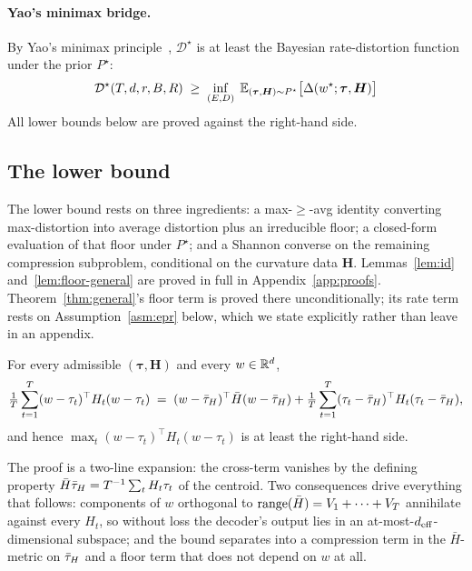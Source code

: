 \paragraph{Yao's minimax bridge.} By Yao's minimax
principle~\citep{yao1977}, $\mathcal{D}^\star$ is at least the
Bayesian rate-distortion function under the prior $P^\star$:
\begin{equation}\label{eq:yao}
  \mathcal{D}^\star(T,d,r,B,R)
  \;\geq\;
  \inf_{(E,D)}\;\mathbb{E}_{(\boldsymbol\tau,\boldsymbol H)\sim P^\star}
    \bigl[\Delta(w^\star;\boldsymbol\tau,\boldsymbol H)\bigr]
\end{equation}
All lower bounds below are proved against the right-hand side.

\subsection{The lower bound}
\label{app:rd-lower}

The lower bound rests on three ingredients: a max-$\geq$-avg identity
converting max-distortion into average distortion plus an irreducible
floor; a closed-form evaluation of that floor under $P^\star$; and a
Shannon converse on the remaining compression subproblem, conditional
on the curvature data $\boldsymbol H$. Lemmas~\ref{lem:id}
and~\ref{lem:floor-general} are proved in full in
Appendix~\ref{app:proofs}. Theorem~\ref{thm:general}'s floor term is proved
there unconditionally; its rate term rests on Assumption~\ref{asm:epr} below,
which we state explicitly rather than leave in an appendix.

\begin{lemma}\label{lem:id}
For every admissible $(\boldsymbol\tau, \boldsymbol H)$ and every
$w\in\mathbb{R}^d$,
\begin{equation}\label{eq:id-eq}
  \tfrac1T\sum_{t=1}^T (w-\tau_t)^\top H_t (w-\tau_t)
  \;=\; (w-\bar{\tau}_H)^\top\bar H(w-\bar{\tau}_H) + \tfrac1T\sum_{t=1}^T
  (\tau_t-\bar{\tau}_H)^\top H_t (\tau_t-\bar{\tau}_H),
\end{equation}
and hence $\max_t (w-\tau_t)^\top H_t(w-\tau_t)$ is at least the
right-hand side.
\end{lemma}

The proof is a two-line expansion: the cross-term vanishes by the
defining property $\bar H\bar{\tau}_H = T^{-1}\sum_t H_t\tau_t$ of the
centroid. Two consequences drive everything that follows: components
of $w$ orthogonal to $\operatorname{range}(\bar H) = V_1+\cdots+V_T$ annihilate
against every $H_t$, so without loss the decoder's output lies in an
at-most-$d_{\mathrm{eff}}$-dimensional subspace; and the bound separates into a
compression term in the $\bar H$-metric on $\bar{\tau}_H$ and a floor term
that does not depend on $w$ at all.

